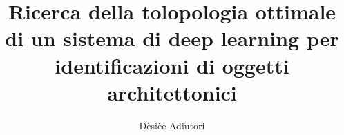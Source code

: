 \documentclass[a4paper,12pt]{report}
\begin{document}
	\title{Ricerca della tolopologia ottimale di un sistema di deep learning per identificazioni di oggetti architettonici} %
	\author{D\`{e}si\`{e}e Adiutori}
	\date{}
	\maketitle
\end{document}
